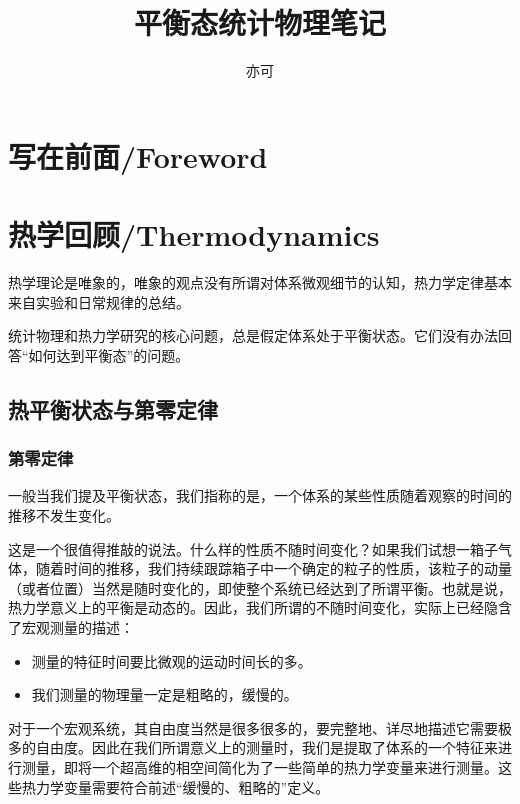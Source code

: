 \documentclass[a4paper, 10pt, openany]{book}%
\begin{document}
  \title{ \heiti 平衡态统计物理笔记}
  \author{亦可}
  \maketitle
  \tableofcontents


  \newpage

  \chapter{写在前面/Foreword}
  \chapter{热学回顾/Thermodynamics}

  热学理论是唯象的，唯象的观点没有所谓对体系微观细节的认知，热力学定律基本来自实验和日常规律的总结。

  统计物理和热力学研究的核心问题，总是假定体系处于平衡状态。它们没有办法回答“如何达到平衡态”的问题。

\section{热平衡状态与第零定律}

\subsection{第零定律}
一般当我们提及平衡状态，我们指称的是，一个体系的某些性质随着观察的时间的推移不发生变化。

这是一个很值得推敲的说法。什么样的性质不随时间变化？如果我们试想一箱子气体，随着时间的推移，我们持续跟踪箱子中一个确定的粒子的性质，该粒子的动量（或者位置）当然是随时变化的，即使整个系统已经达到了所谓平衡。也就是说，热力学意义上的平衡是动态的。因此，我们所谓的不随时间变化，实际上已经隐含了宏观测量的描述：

\begin{itemize}
\item 测量的特征时间要比微观的运动时间长的多。

\item 我们测量的物理量一定是粗略的，缓慢的。
\end{itemize}

对于一个宏观系统，其自由度当然是很多很多的，要完整地、详尽地描述它需要极多的自由度。因此在我们所谓意义上的测量时，我们是提取了体系的一个特征来进行测量，即将一个超高维的相空间简化为了一些简单的热力学变量来进行测量。这些热力学变量需要符合前述“缓慢的、粗略的”定义。
\end{document}
